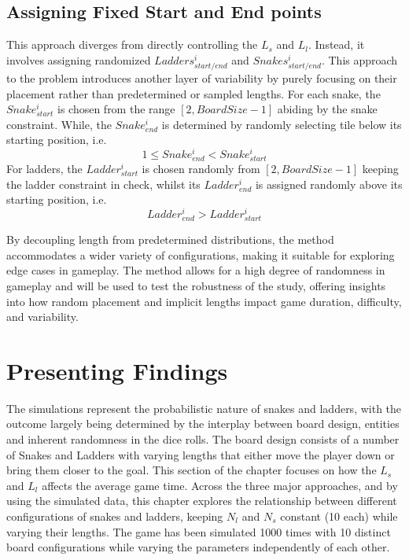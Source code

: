 \documentclass[12pt]{report}
\begin{document}
	\subsection{Assigning Fixed Start and End points}
	This approach diverges from directly controlling the $L_s$ and $L_l$. Instead, it involves assigning randomized $Ladders^i_{start/end}$ and $Snakes^i_{start/end}$. This approach to the problem introduces another layer of variability by purely focusing on their placement rather than predetermined or sampled lengths.
	For each snake, the $Snake^i_{start}$ is chosen from the range $[2, BoardSize - 1]$ abiding by the snake constraint. While, the $Snake^i_{end}$ is determined by randomly selecting tile below its starting position, i.e. $$1\leq Snake^i_{end} < Snake^i_{start}$$ 
	For ladders, the $Ladder^i_{start}$ is chosen randomly from $[2, BoardSize - 1]$ keeping the ladder constraint in check, whilst its $Ladder^i_{end}$ is assigned randomly above its starting position, i.e. $$Ladder^i_{end}>Ladder^i_{start}$$ 
	
	By decoupling length from predetermined distributions, the method accommodates a wider variety of configurations, making it suitable for exploring edge cases in gameplay. The method allows for a high degree of randomness in gameplay and will be used to test the robustness of the study, offering insights into how random placement and implicit lengths impact game duration, difficulty, and variability.
	
	\section{Presenting Findings}
	The simulations represent the probabilistic nature of snakes and ladders, with the outcome largely being determined by the interplay between board design, entities and inherent randomness in the dice rolls. The board design consists of a number of Snakes and Ladders with varying lengths that either move the player down or bring them closer to the goal.  This section of the chapter focuses on how the $L_{s}$ and $L_{l}$ affects the average game time. Across the three major approaches, and by using the simulated data, this chapter explores the relationship between different configurations of snakes and ladders, keeping $N_l$ and $N_s$ constant (10 each) while varying their lengths. The game has been simulated 1000 times with 10 distinct board configurations while varying the parameters independently of each other.
\end{document}
